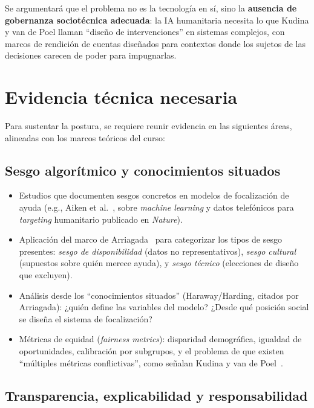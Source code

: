 \documentclass[12pt, a4paper]{article}
\begin{document}
Se argumentará que el problema no es la tecnología en sí, sino la \textbf{ausencia de gobernanza sociotécnica adecuada}: la IA humanitaria necesita lo que Kudina y van de Poel llaman ``diseño de intervenciones'' en sistemas complejos, con marcos de rendición de cuentas diseñados para contextos donde los sujetos de las decisiones carecen de poder para impugnarlas.

\section{Evidencia técnica necesaria}

Para sustentar la postura, se requiere reunir evidencia en las siguientes áreas, alineadas con los marcos teóricos del curso:

\subsection{Sesgo algorítmico y conocimientos situados}

\begin{itemize}[leftmargin=2em]
    \item Estudios que documenten sesgos concretos en modelos de focalización de ayuda (e.g., Aiken et al.~\cite{aiken2022machine}, sobre \textit{machine learning} y datos telefónicos para \textit{targeting} humanitario publicado en \textit{Nature}).
    \item Aplicación del marco de Arriagada~\cite{arriagada2024sesgos} para categorizar los tipos de sesgo presentes: \textit{sesgo de disponibilidad} (datos no representativos), \textit{sesgo cultural} (supuestos sobre quién merece ayuda), y \textit{sesgo técnico} (elecciones de diseño que excluyen).
    \item Análisis desde los ``conocimientos situados'' (Haraway/Harding, citados por Arriagada): ¿quién define las variables del modelo? ¿Desde qué posición social se diseña el sistema de focalización?
    \item Métricas de equidad (\textit{fairness metrics}): disparidad demográfica, igualdad de oportunidades, calibración por subgrupos, y el problema de que existen ``múltiples métricas conflictivas'', como señalan Kudina y van de Poel~\cite{kudina2024sociotechnical}.
\end{itemize}

\subsection{Transparencia, explicabilidad y responsabilidad}
\end{document}
